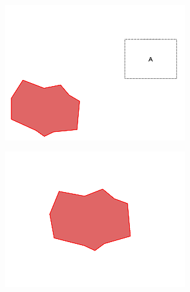 \begin{minipage}{\linewidth}
	\centering
	\begin{minipage}{0.42\linewidth}
		\includegraphics[width=\linewidth]{../ui_experiment/slide_images/Swarm_Robot_Control_-_Unknown_Number_of_Robots_0033.png}
		\label{fig:sub2}
	\end{minipage}
	\hspace{0.05\linewidth}
	\begin{minipage}{0.42\linewidth}
		\includegraphics[width=\linewidth]{../ui_experiment/slide_images/Swarm_Robot_Control_-_Unknown_Number_of_Robots_0035.png}
		\label{fig:sub1}
	\end{minipage}
\end{minipage}